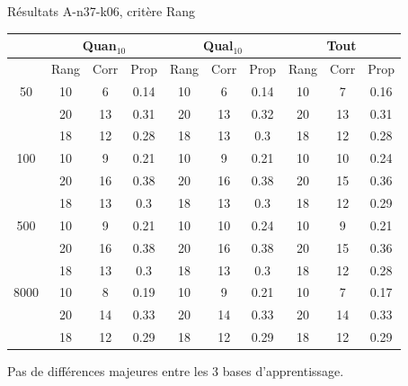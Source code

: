 \documentclass{beamer}
\begin{document}
\begin{frame}{Résultats A-n37-k06, critère Rang}
\begin{table}[H]

\begin{tabular}{|@{}c@{}|@{}c@{}|@{}c@{}|@{}c@{}||@{}c@{}|@{}c@{}|@{}c@{}||@{}c@{}|@{}c@{}|@{}c@{}|}

\hline
 & \multicolumn{3}{c|}{Quan$_{10}$} & \multicolumn{3}{c|}{Qual$_{10}$} & \multicolumn{3}{c|}{Tout} \\
 \hline
 & Rang & Corr & Prop & Rang & Corr & Prop & Rang & Corr & Prop \\
 \hline
 50 & 10  & 6 & 0.14 & 10  & 6 & 0.14 & 10  & 7 & 0.16  \\
 \cline{2-10} 
    & 20 & 13 & 0.31 & 20  & 13 & 0.32 & 20  & 13 & 0.31  \\
 \cline{2-10} 
    & 18 & 12 & 0.28 & 18 & 13 & 0.3 & 18 & 12 & 0.28  \\
  \hline
   100 & 10  & 9 & 0.21 & 10  & 9 & 0.21 & 10  & 10 & 0.24  \\
 \cline{2-10} 
    & 20 & 16 & 0.38 & 20 & 16 & 0.38 & 20 & 15 & 0.36  \\
  \cline{2-10} 
    & 18 & 13 & 0.3 & 18 & 13 & 0.3 & 18 & 12 & 0.29  \\
  \hline
   500 & 10  & 9 & 0.21 & 10  & 10 & 0.24 & 10  & 9 & 0.21  \\
 \cline{2-10} 
    & 20 & 16 & 0.38 & 20 & 16 & 0.38 & 20 & 15 & 0.36  \\
  \cline{2-10} 
    & 18 & 13 & 0.3 & 18 & 13 & 0.3 & 18 & 12 & 0.28  \\
  \hline
   8000 & 10 & 8 & 0.19 & 10 & 9 & 0.21 & 10 & 7 & 0.17  \\
 \cline{2-10} 
    & 20 & 14 & 0.33 & 20 & 14 & 0.33 & 20 & 14 & 0.33  \\
  \cline{2-10} 
    & 18 & 12 & 0.29 & 18 & 12 & 0.29 & 18 & 12 & 0.29  \\
  \hline

\end{tabular}
\end{table}

Pas de différences majeures entre les 3 bases d'apprentissage.


\end{frame}
\end{document}
